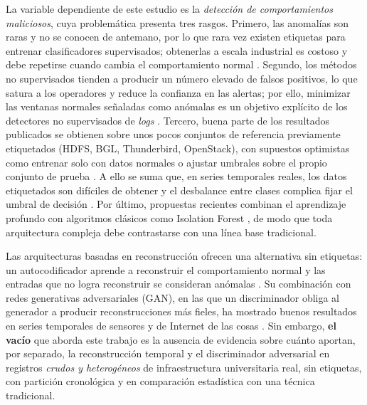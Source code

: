 \documentclass[jou,a4paper,floatsintext,donotrepeattitle]{apa7}
\begin{document}
La variable dependiente de este estudio es la \textit{detección de comportamientos maliciosos}, cuya problemática presenta tres rasgos. Primero, las anomalías son raras y no se conocen de antemano, por lo que rara vez existen etiquetas para entrenar clasificadores supervisados; obtenerlas a escala industrial es costoso y debe repetirse cuando cambia el comportamiento normal \parencite{albert2025}. Segundo, los métodos no supervisados tienden a producir un número elevado de falsos positivos, lo que satura a los operadores y reduce la confianza en las alertas; por ello, minimizar las ventanas normales señaladas como anómalas es un objetivo explícito de los detectores no supervisados de \textit{logs} \parencite{farzad2020}. Tercero, buena parte de los resultados publicados se obtienen sobre unos pocos conjuntos de referencia previamente etiquetados (HDFS, BGL, Thunderbird, OpenStack), con supuestos optimistas como entrenar solo con datos normales o ajustar umbrales sobre el propio conjunto de prueba \parencite{albert2025}. A ello se suma que, en series temporales reales, los datos etiquetados son difíciles de obtener y el desbalance entre clases complica fijar el umbral de decisión \parencite{yokkampon2022}. Por último, propuestas recientes combinan el aprendizaje profundo con algoritmos clásicos como Isolation Forest \parencite{farzad2020}, de modo que toda arquitectura compleja debe contrastarse con una línea base tradicional.

Las arquitecturas basadas en reconstrucción ofrecen una alternativa sin etiquetas: un autocodificador aprende a reconstruir el comportamiento normal y las entradas que no logra reconstruir se consideran anómalas \parencite{aslam2024,gorokhov2023}. Su combinación con redes generativas adversariales (GAN), en las que un discriminador obliga al generador a producir reconstrucciones más fieles, ha mostrado buenos resultados en series temporales de sensores y de Internet de las cosas \parencite{niu2020,qian2025}. Sin embargo, \textbf{el vacío} que aborda este trabajo es la ausencia de evidencia sobre cuánto aportan, por separado, la reconstrucción temporal y el discriminador adversarial en registros \emph{crudos y heterogéneos} de infraestructura universitaria real, sin etiquetas, con partición cronológica y en comparación estadística con una técnica tradicional.
\end{document}
